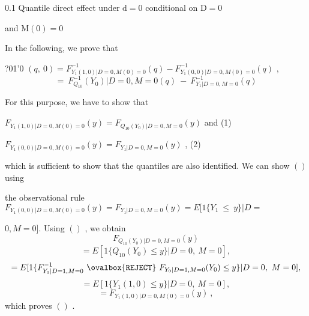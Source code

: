 \documentclass[a4paper,12pt]{article}
\begin{document}
0.1 Quantile direct effect under $\mathrm{d}=0$ conditional on $\mathrm{D}=0$

and $\mathrm{M}(0)=0$

In the following, we prove that
\begin{center}
?01'0 $(q,\ 0) = F_{Y_{1}(1,0)|D=0,M(0)=0}^{-1}(q) - F_{Y_{1}(0,0)|D=0,M(0)=0}^{-1}(q)$ ,
$$
=\ F_{Q_{10}}^{-1}(Y_{0})|D=0,M=0(q)\ -\ F_{Y_{1}|D=0,M=0}^{-1}(q)
$$
\end{center}
For this purpose, we have to show that
\begin{center}
$F_{Y_{1}(1,0)|D=0,M(0)=0}(y)=F_{Q_{10}(Y_{0})|D=0,M=0}(y)$ and   (1)

$F_{Y_{1}(0,0)|D=0,M(0)=0}(y)=F_{Y_{1}|D=0,M=0}(y)$ ,   (2)
\end{center}
which is sufficient to show that the quantiles are also identified. We can show $()$ using

the observational rule $F_{Y_{1}(0,0)|D=0,M(0)=0}(y) = F_{Y_{1}|D=0,M=0}(y) = E[1\{Y_{1}\ \leq\ y\}|D =$

$0, M=0]$. Using $()$ , we obtain
$$
F_{Q_{10}(Y_{0})|D=0,M=0}(y)
$$
$$
=E[1\{Q_{10}(Y_{0})\leq y\}|D=0,\ M=0],
$$
$$
=E[1\{F_{Y_{1}|D=1,M=0}^{-1}\ \ovalbox{\tt\small REJECT}\ F_{Y_{0}|D=1,M=0}(Y_{0})\leq y\}|D=0,\ M=0],
$$
$$
=E[1\{Y_{1}(1,0)\leq y\}|D=0,\ M=0],
$$
$$
=F_{Y_{1}(1,0)|D=0,M(0)=0}(y)\ ,
$$
which proves $()$ .
\end{document}
